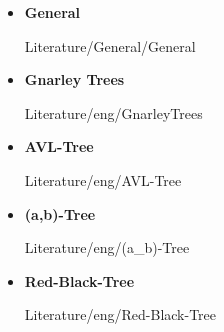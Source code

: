 \begin{itemize}
  \item
    \textbf{General}
    \begin{btSect}{Literature/General/General}
      \btPrintAll
    \end{btSect}
  \item
    \textbf{Gnarley Trees}
    \begin{btSect}{Literature/eng/GnarleyTrees}
      \btPrintAll
    \end{btSect}
\end{itemize}
\newpage
\begin{itemize}
  \item
    \textbf{AVL-Tree}
    \begin{btSect}{Literature/eng/AVL-Tree}
      \btPrintAll
    \end{btSect}
  \item
    \textbf{(a,b)-Tree}
    \begin{btSect}{Literature/eng/(a_b)-Tree}
      \btPrintAll
    \end{btSect}
\end{itemize}
\newpage
\begin{itemize}
  \item
    \textbf{Red-Black-Tree}
    \begin{btSect}{Literature/eng/Red-Black-Tree}
      \btPrintAll
    \end{btSect}
\end{itemize}